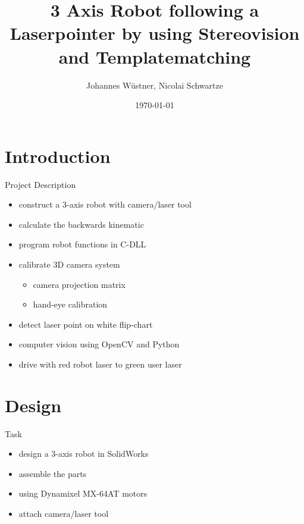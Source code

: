 \documentclass{beamer}
\title[jeff\textunderscore junior]{3 Axis Robot following a Laserpointer by using Stereovision and Templatematching}
\author[jwu, nsc]{Johannes Wüstner, Nicolai Schwartze}
\date{\today}
\begin{document}
\maketitle

\section{Introduction}
\frame{\tableofcontents}

\begin{frame}{Project Description}

\begin{itemize}
	\item construct a 3-axis robot with camera/laser tool
	\item calculate the backwards kinematic 
	\item program robot functions in C-DLL
	\item calibrate 3D camera system
	\begin{itemize}
		\item camera projection matrix
		\item hand-eye calibration
	\end{itemize}
	\item detect laser point on white flip-chart
	\item computer vision using OpenCV and Python
	\item drive with red robot laser to green user laser
\end{itemize}

\end{frame}


\section{Design}
\frame{\tableofcontents[currentsection]}

\begin{frame}{Task}
\begin{itemize}
	\item design a 3-axis robot in SolidWorks \\
	\item assemble the parts \\
	\item using Dynamixel MX-64AT motors \\
	\item attach camera/laser tool \\
\end{itemize}


\end{frame}
\end{document}
